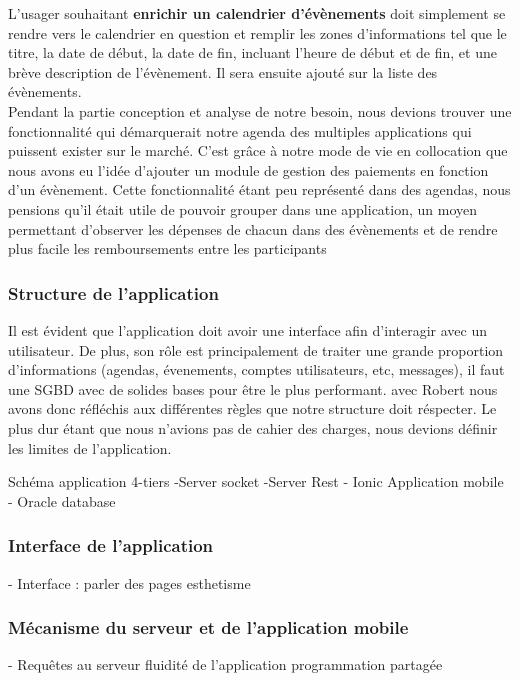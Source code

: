 L'usager souhaitant \textbf{enrichir un calendrier d'évènements} doit simplement se rendre vers le calendrier en question et remplir les zones d'informations tel que le titre, la date de début, la date de fin, incluant l'heure de début et de fin, et une brève description de l'évènement. Il sera ensuite ajouté sur la liste des évènements.
\\
Pendant la partie conception et analyse de notre besoin, nous devions trouver une fonctionnalité qui démarquerait notre agenda des multiples applications qui puissent exister sur le marché.
C'est grâce à notre mode de vie en collocation que nous avons eu l'idée d'ajouter un module de gestion des paiements en fonction d'un évènement. Cette fonctionnalité étant peu représenté dans des agendas, nous pensions qu'il était utile de pouvoir grouper dans une application, un moyen permettant d'observer les dépenses de chacun dans des évènements et de rendre plus facile les remboursements entre les participants

\newpage

\subsubsection{Structure de l'application}

Il est évident que l'application doit avoir une interface afin d'interagir avec un utilisateur. De plus, son rôle est principalement de traiter une grande proportion d'informations (agendas, évenements, comptes utilisateurs, etc, messages), il faut une SGBD avec de solides bases pour être le plus performant. avec Robert nous avons donc réfléchis aux différentes règles que notre structure doit réspecter.
Le plus dur étant que nous n'avions pas de cahier des charges, nous devions définir les limites de l'application.

Schéma application 4-tiers
-Server socket
-Server Rest
- Ionic Application mobile
- Oracle database

\subsubsection{Interface de l'application}
- Interface :
parler des pages
esthetisme

\subsubsection{Mécanisme du serveur et de l'application mobile}

- Requêtes au serveur 
fluidité de l'application 
programmation partagée


